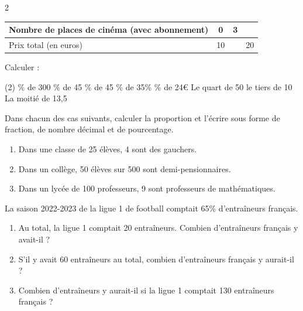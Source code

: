 \documentclass[10pt,a4paper]{article}
\begin{document}
\begin{multicols}{2}
\begin{exo}[][appro]
\begin{tasks}
    \task     \begin{tabular}{|p{4.5cm}|*{3}{c|}}
        \hline
        Nombre de places de cinéma (avec abonnement) & 0 & 3  &  \\ \hline
        Prix total (en euros) & 10 &  & 20 \\ \hline
    \end{tabular}
    \end{tasks}
\end{exo}

\begin{exo}[][]
Calculer :\begin{tasks}(2)
    \% de 300
    \% de 45
    \% de 45
    \% de 35\%
    \% de 24\euro
    \task Le quart de 50
    \task le tiers de 10
    \task La moitié de 13,5
\end{tasks}
\end{exo}


\begin{exo}[][]
Dans chacun des cas suivants, calculer la proportion et l'écrire sous forme de fraction, de nombre décimal et de pourcentage.
\begin{enumerate}
    \item Dans une classe de 25 élèves, 4 sont des gauchers.
    \item Dans un collège, 50 élèves sur 500 sont demi-pensionnaires.
    \item Dans un lycée de 100 professeurs, 9 sont professeurs de mathématiques.
\end{enumerate}
\end{exo}

\begin{exo}[][]
La saison 2022-2023 de la ligue 1 de football comptait 65\% d'entraîneurs français.
\begin{enumerate}
    \item Au total, la ligue 1 comptait 20 entraîneurs. Combien d'entraîneurs français y avait-il ?
    \item S'il y avait 60 entraîneurs au total, combien d'entraîneurs français y aurait-il ?
    \item Combien d'entraîneurs y aurait-il si la ligue 1 comptait 130 entraîneurs français ?
\end{enumerate} 


\end{exo}
\end{multicols}
\end{document}
